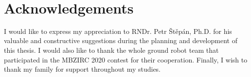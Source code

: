 ~\vfill{}

\section*{Acknowledgements}

I would like to express my appreciation to RNDr. Petr Štěpán, Ph.D. for his valuable and constructive suggestions during the planning and development of this thesis. I would also like to thank the whole ground robot team that participated in the MBZIRC 2020 contest for their cooperation. Finally, I wish to thank my family for support throughout my studies.

\vspace{2.5cm}

\newpage{}
